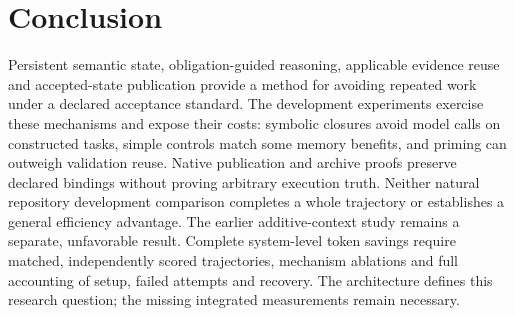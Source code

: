 \section{Conclusion}
\label{sec:conclusion}

Persistent semantic state, obligation-guided reasoning, applicable evidence
reuse and accepted-state publication provide a method for avoiding repeated
work under a declared acceptance standard. The development experiments exercise
these mechanisms and expose their costs: symbolic closures avoid model calls
on constructed tasks, simple controls match some memory benefits, and priming
can outweigh validation reuse. Native publication and archive proofs preserve
declared bindings without proving arbitrary execution truth. Neither natural
repository development comparison completes a whole trajectory or establishes a
general efficiency advantage. The earlier additive-context study remains a
separate, unfavorable result. Complete system-level token savings require
matched, independently scored trajectories, mechanism ablations and full
accounting of setup, failed attempts and recovery. The architecture defines
this research question; the missing integrated measurements remain necessary.
